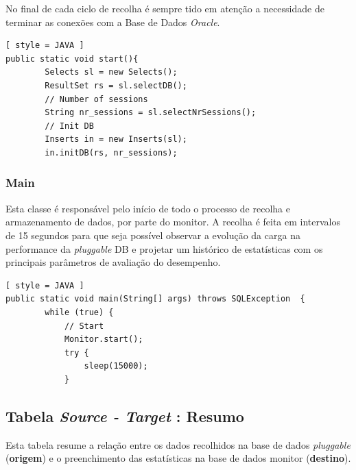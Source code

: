 \documentclass[a4paper]{article}
\begin{document}
No final de cada ciclo de recolha é sempre tido em atenção a necessidade de terminar as conexões com a Base de Dados \emph{Oracle}.

\begin{lstlisting}[ style = JAVA ]
public static void start(){
        Selects sl = new Selects();                                  
        ResultSet rs = sl.selectDB();
        // Number of sessions
        String nr_sessions = sl.selectNrSessions();
        // Init DB
        Inserts in = new Inserts(sl);
        in.initDB(rs, nr_sessions);
\end{lstlisting}

\subsubsection{Main}
\hspace{3mm} 

Esta classe é responsável pelo início de todo o processo de recolha e armazenamento de dados, por parte do monitor. A recolha é feita em intervalos de 15 segundos para que seja possível observar a evolução da carga na performance da \emph{pluggable} DB e projetar um histórico de estatísticas com os principais parâmetros de avaliação do desempenho.\\

\begin{lstlisting}[ style = JAVA ]
public static void main(String[] args) throws SQLException  {
        while (true) {
            // Start
            Monitor.start();
            try {
                sleep(15000);
            }
\end{lstlisting}


\subsection{Tabela \emph{Source - Target} : Resumo}
\hspace{3mm} 

Esta tabela resume a relação entre os dados recolhidos na base de dados \emph{pluggable} (\textbf{origem}) e o preenchimento das estatísticas na base de dados monitor (\textbf{destino}).
\end{document}
